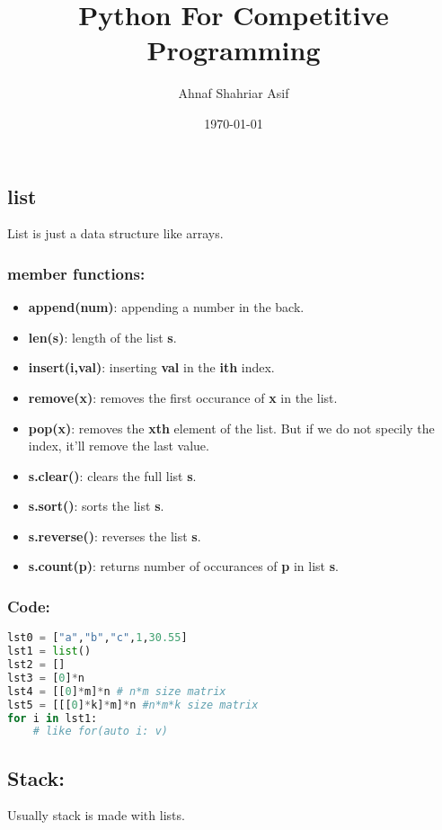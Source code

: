 \documentclass[12pt]{article}
\begin{document}
\title{Python For Competitive Programming}
\author{Ahnaf Shahriar Asif}
\date{\today}
\maketitle
\tableofcontents
\newpage
\subsection{list}
List is just a data structure like arrays. 
\subsubsection{member functions:}
\begin{itemize}
\item \textbf{append(num)}: appending a number in the back.
\item \textbf{len(s)}: length of the list \textbf{s}.
\item \textbf{insert(i,val)}: inserting \textbf{val} in the \textbf{ith} index.
\item \textbf{remove(x)}: removes the first occurance of \textbf{x} in the list. 
\item \textbf{pop(x)}: removes the \textbf{xth} element of the list. But if we do not specily the index, it'll remove the last value. 
\item \textbf{s.clear()}: clears the full list \textbf{s}.
\item \textbf{s.sort()}: sorts the list \textbf{s}.
\item \textbf{s.reverse()}: reverses the list \textbf{s}.
\item \textbf{s.count(p)}: returns number of occurances of \textbf{p} in list \textbf{s}.
\end{itemize}
\subsubsection{Code: }
\begin{lstlisting}[language=Python,tabsize=3]
lst0 = ["a","b","c",1,30.55] 
lst1 = list() 
lst2 = [] 
lst3 = [0]*n 
lst4 = [[0]*m]*n # n*m size matrix 
lst5 = [[[0]*k]*m]*n #n*m*k size matrix
for i in lst1: 
	# like for(auto i: v)
\end{lstlisting}
\newpage
\subsection{Stack: }
Usually stack is made with lists.
\end{document}
